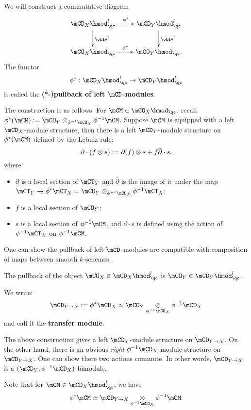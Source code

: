 	\begin{constr}
		We will construct a commutative diagram
		\[
			\xymatrix{
				\mCD_X\hmod^l_\qc \ar@{.>}[r]^-{\phi^*} \ar[d]^-{\oblv^l} &
				\mCD_Y\hmod^l_\qc \ar[d]^-{\oblv^l} \\
				\mCO_X\hmod_\qc \ar[r]^-{\phi^*} & \mCO_Y\hmod_\qc.
			}
		\]
		The functor 
		\[
			\phi^*: \mCD_X\hmod^l_\qc \to \mCD_Y\hmod^l_\qc
		\]
		is called the \textbf{($*$-)pullback of left $\mCD$-modules}.

		The construction is as follows. For $\mCM\in \mCO_X\hmod_\qc$, recall $\phi^*(\mCM):= \mCO_Y \ot_{\phi^{-1}\mCO_X} \phi^{-1}\mCM$. Suppose $\mCM$ is equipped with a left $\mCD_X$-module structure, then there is a left $\mCD_Y$-module structure on $\phi^*(\mCM)$ defined by the Lebniz rule:
		\[
			\partial \cdot ( f\ot  s) :=  \partial(f) \ot s + f \overline{\partial} \cdot s,
		\]
		where
		\begin{itemize}
			\item 
				$\partial$ is a local section of $\mCT_Y$ and $\overline{\partial}$ is the image of it under the map $\mCT_Y \to \phi^*\mCT_X = \mCO_Y \ot_{\phi^{-1}\mCO_X} \phi^{-1}\mCT_X  $;
			\item
				$f$ is a local section of $\mCO_Y$;
			\item
				$s$ is a local section of $\phi^{-1}\mCM$, and $\overline{\partial}\cdot s$ is defined using the action of $\phi^{-1}\mCT_X$ on $\phi^{-1}\mCM$.
		\end{itemize}
	\end{constr}

	\begin{rem}
		One can show the pullback of left $\mCD$-modules are compatible with composition of maps between smooth $k$-schemes.
	\end{rem}

	\begin{exam}
		The pullback of the object $\mCO_X\in \mCD_X\hmod^l_\qc$ is $\mCO_Y\in \mCD_Y\hmod^l_\qc$.
	\end{exam}

	\begin{constr}
		We write:
		\[
			\mCD_{Y\to X}:= \phi^*\mCD_X \simeq \mCO_Y \ot_{\phi^{-1}\mCO_X} \phi^{-1}\mCD_X  
		\]
		and call it the \textbf{transfer module}.

		The above construction gives a left $\mCD_Y$-module structure on $\mCD_{Y\to X}$. On the other hand, there is an obvious \emph{right} $\phi^{-1}\mCD_X$-module structure on $\mCD_{Y\to X}$. One can show there two actions commute. In other words, $\mCD_{Y\to X}$ is a $(\mCD_Y, \phi^{-1}\mCD_X)$-bimodule.

		Note that for $\mCM \in  \mCD_X\hmod^l_\qc$, we have
		\[
			\phi^* \mCM \simeq \mCD_{Y\to X}\ot_{ \phi^{-1}\mCD_X } \phi^{-1}\mCM.
		\]
	\end{constr}

